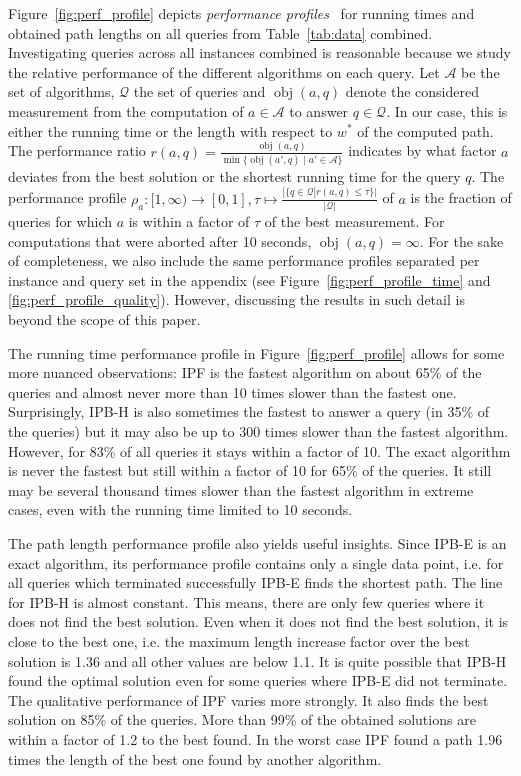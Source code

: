 \documentclass[a4paper,UKenglish,cleveref, autoref, thm-restate]{lipics-v2021}
\begin{document}
Figure~\ref{fig:perf_profile} depicts \emph{performance profiles}~\cite{dolan2002benchmarking} for running times and obtained path lengths on all queries from Table~\ref{tab:data} combined.
Investigating queries across all instances combined is reasonable because we study the relative performance of the different algorithms on each query.
Let $\mathcal{A}$ be the set of algorithms, $\mathcal{Q}$ the set of queries and $\operatorname{obj}(a, q)$ denote the considered measurement from the computation of $a \in \mathcal{A}$ to answer $q \in \mathcal{Q}$.
In our case, this is either the running time or the length with respect to $w^*$ of the computed path.
The performance ratio $r(a,q) = \frac{\operatorname{obj}(a, q)}{\min{\{\operatorname{obj}(a', q) \mid a' \in \mathcal{A}\}}}$ indicates by what factor $a$ deviates from the best solution or the shortest running time for the query $q$.
The performance profile $\rho_a : [1,\infty) \to [0,1], \tau \mapsto \frac{|\{q \in \mathcal{Q} | r(a, q) \leq \tau \}|}{|\mathcal{Q}|}$ of $a$ is the fraction of queries for which $a$ is within a factor of $\tau$ of the best measurement.
For computations that were aborted after 10 seconds, $\operatorname{obj}(a, q) = \infty$.
For the sake of completeness, we also include the same performance profiles separated per instance and query set in the appendix (see Figure~\ref{fig:perf_profile_time} and \ref{fig:perf_profile_quality}).
However, discussing the results in such detail is beyond the scope of this paper.

The running time performance profile in Figure~\ref{fig:perf_profile} allows for some more nuanced observations:
IPF is the fastest algorithm on about 65\% of the queries and almost never more than 10 times slower than the fastest one.
Surprisingly, IPB-H is also sometimes the fastest to answer a query (in 35\% of the queries) but it may also be up to 300 times slower than the fastest algorithm.
However, for 83\% of all queries it stays within a factor of 10.
The exact algorithm is never the fastest but still within a factor of 10 for 65\% of the queries.
It still may be several thousand times slower than the fastest algorithm in extreme cases, even with the running time limited to 10 seconds.

The path length performance profile also yields useful insights.
Since IPB-E is an exact algorithm, its performance profile contains only a single data point, i.e. for all queries which terminated successfully IPB-E finds the shortest path.
The line for IPB-H is almost constant.
This means, there are only few queries where it does not find the best solution.
Even when it does not find the best solution, it is close to the best one, i.e. the maximum length increase factor over the best solution is 1.36 and all other values are below 1.1.
It is quite possible that IPB-H found the optimal solution even for some queries where IPB-E did not terminate.
The qualitative performance of IPF varies more strongly.
It also finds the best solution on 85\% of the queries.
More than 99\% of the obtained solutions are within a factor of 1.2 to the best found.
In the worst case IPF found a path 1.96 times the length of the best one found by another algorithm.
\end{document}
